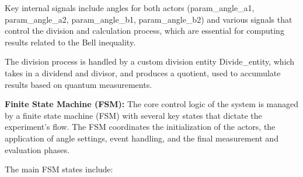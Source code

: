 Key internal signals include angles for both actors (param\_angle\_a1, param\_angle\_a2, param\_angle\_b1, param\_angle\_b2) and various signals that control the division and calculation process, which are essential for computing results related to the Bell inequality.

The division process is handled by a custom division entity Divide\_entity, which takes in a dividend and divisor, and produces a quotient, used to accumulate results based on quantum measurements.

\textbf{Finite State Machine (FSM): \newline}
The core control logic of the system is managed by a finite state machine (FSM) with several key states that dictate the experiment's flow. The \acs{FSM} coordinates the initialization of the actors, the application of angle settings, event handling, and the final measurement and evaluation phases.

The main \acs{FSM} states include:

